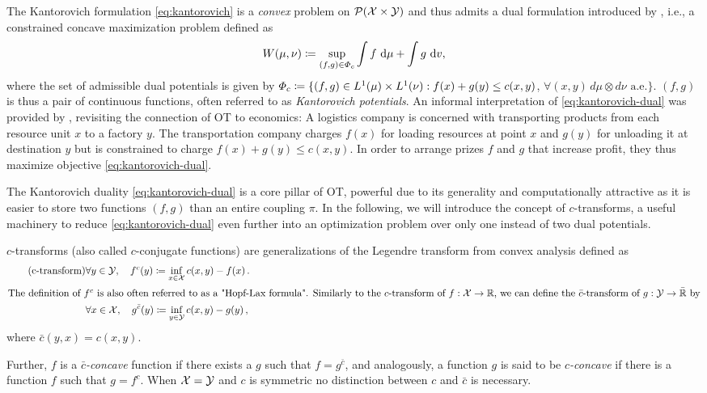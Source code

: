 The Kantorovich formulation \eqref{eq:kantorovich} is a \emph{convex} problem on ${\mathcal{P}}(\mathcal{X} \times \mathcal{Y})$ and thus admits a dual formulation introduced by \citet{kantorovich1942transfer}, i.e., a constrained concave maximization problem defined as
\begin{equation} \label{eq:kantorovich-dual}
    W(\mu, \nu)\coloneqq\sup _{(f, g) \in \Phi_{c}} \int f \mathrm{~d} \mu+\int g \mathrm{~d} v,
\end{equation}
 where the set of admissible dual potentials is given by $\Phi_c \coloneqq \{(f, g) \in L^{1}(\mu) \times L^{1}(\nu): f(x)+g(y) \leq c(x,y)$, $\forall(x, y)\, d\mu \otimes d\nu \text{ a.e.}\}$.
$(f, g)$ is thus a pair of continuous functions, often referred to as \emph{Kantorovich potentials}.
An informal interpretation of \eqref{eq:kantorovich-dual} was provided by \citet{caffarelli2003monge}, revisiting the connection of \acrshort{OT} to economics: 
A logistics company is concerned with transporting products from each resource unit $x$ to a factory $y$. The transportation company charges $f(x)$ for loading resources at point $x$ and $g(y)$ for unloading it at destination $y$ but is constrained to charge $f(x)+g(y) \le c(x,y)$. In order to arrange prizes $f$ and $g$ that increase profit, they thus maximize objective \eqref{eq:kantorovich-dual}.

The Kantorovich duality \eqref{eq:kantorovich-dual} is a core pillar of \acrlong{OT}, powerful due to its generality and computationally attractive as it is easier to store two functions $(f, g)$ than an entire coupling $\pi$.
In the following, we will introduce the concept of $c$-transforms, a useful machinery to reduce \eqref{eq:kantorovich-dual} even further into an optimization problem over only one instead of two dual potentials.
\begin{definition}[$c$-transform] \label{eq:c-transform} 
	$c$-transforms (also called $c$-conjugate functions) are generalizations of the Legendre transform from convex analysis defined as
\begin{align*} \tag{c-transform}
	& \forall y \in {\mathcal{Y}}, \quad f^c(y) \coloneqq \inf _{x \in {\mathcal{X}}} c(x, y)-f(x) \,. \\
	\intertext{The definition of $f^c$ is also often referred to as a "Hopf-Lax formula". Similarly to the $c$-transform of $f : {\mathcal{X}} \rightarrow \mathbb{R}$, we can define the $\bar{c}$-transform of $g : {\mathcal{Y}} \rightarrow \bar{\mathbb{R}}$ by}
	& \forall x \in {\mathcal{X}}, \quad g^{\bar{c}}(y) \coloneqq \inf _{y \in {\mathcal{Y}}} c(x, y)-g(y) \,,
\end{align*}
where $\bar{c}(y, x) = c(x, y)$. 
\end{definition}
Further, $f$ is a \textit{$\bar{c}$-concave} function if there exists a $g$ such that $f = g^{\bar{c}}$, and analogously, a function $g$ is said to be \textit{$c$-concave} if there is a function $f$ such that $g = f^c$.
When ${\mathcal{X}} = {\mathcal{Y}}$ and $c$ is symmetric no distinction between $c$ and $\bar{c}$ is necessary.

